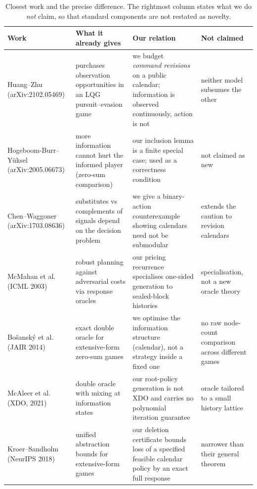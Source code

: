 \begin{table}[!htb]
\centering\small
\caption{Closest work and the precise difference.  The rightmost column states
what we do \emph{not} claim, so that standard components are not restated as
novelty.}
\label{tab:literature}
\begin{tabular}{p{3.1cm}p{3.6cm}p{4.4cm}p{2.4cm}}
\toprule
Work & What it already gives & Our relation & Not claimed \\
\midrule
Huang--Zhu (arXiv:2102.05469) & purchases observation opportunities in an LQG pursuit--evasion game & we budget \emph{command revisions} on a public calendar; information is observed continuously, action is not & neither model subsumes the other \\
Hogeboom-Burr--Y\"uksel (arXiv:2005.06673) & more information cannot hurt the informed player (zero-sum comparison) & our inclusion lemma is a finite special case; used as a correctness condition & not claimed as new \\
Chen--Waggoner (arXiv:1703.08636) & substitutes vs complements of signals depend on the decision problem & we give a binary-action counterexample showing calendars need not be submodular & extends the caution to revision calendars \\
McMahan et al. (ICML 2003) & robust planning against adversarial costs via response oracles & our pricing recurrence specialises one-sided generation to sealed-block histories & specialisation, not a new oracle theory \\
Bo\v{s}ansk\'y et al. (JAIR 2014) & exact double oracle for extensive-form zero-sum games & we optimise the information structure (calendar), not a strategy inside a fixed one & no raw node-count comparison across different games \\
McAleer et al. (XDO, 2021) & double oracle with mixing at information states & our root-policy generation is not XDO and carries no polynomial iteration guarantee & oracle tailored to a small history lattice \\
Kroer--Sandholm (NeurIPS 2018) & unified abstraction bounds for extensive-form games & our deletion certificate bounds loss of a specified feasible calendar policy by an exact full response & narrower than their general theorem \\
\bottomrule
\end{tabular}
\end{table}
